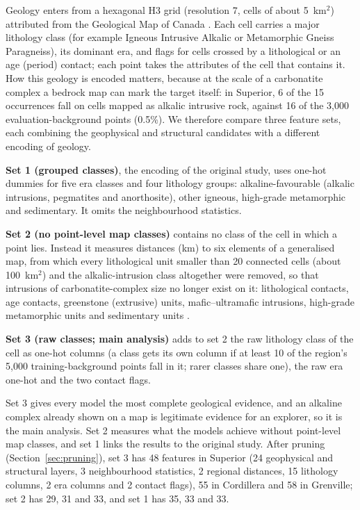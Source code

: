 \documentclass[pdflatex,sn-apa]{sn-jnl}
\begin{document}
Geology enters from a hexagonal H3 grid (resolution 7, cells of about 5~km$^2$) attributed from the Geological Map of Canada \citep{Wheeler1996}. Each cell carries a major lithology class (for example Igneous Intrusive Alkalic or Metamorphic Gneiss Paragneiss), its dominant era, and flags for cells crossed by a lithological or an age (period) contact; each point takes the attributes of the cell that contains it. How this geology is encoded matters, because at the scale of a carbonatite complex a bedrock map can mark the target itself: in Superior, 6 of the 15 occurrences fall on cells mapped as alkalic intrusive rock, against 16 of the 3,000 evaluation-background points (0.5\%). We therefore compare three feature sets, each combining the geophysical and structural candidates with a different encoding of geology.

\textbf{Set 1 (grouped classes)}, the encoding of the original study, uses one-hot dummies for five era classes and four lithology groups: alkaline-favourable (alkalic intrusions, pegmatites and anorthosite), other igneous, high-grade metamorphic and sedimentary. It omits the neighbourhood statistics.

\textbf{Set 2 (no point-level map classes)} contains no class of the cell in which a point lies. Instead it measures distances (km) to six elements of a generalised map, from which every lithological unit smaller than 20 connected cells (about 100~km$^2$) and the alkalic-intrusion class altogether were removed, so that intrusions of carbonatite-complex size no longer exist on it: lithological contacts, age contacts, greenstone (extrusive) units, mafic--ultramafic intrusions, high-grade metamorphic units and sedimentary units \citep[cf.][]{Luo2026}.

\textbf{Set 3 (raw classes; main analysis)} adds to set 2 the raw lithology class of the cell as one-hot columns (a class gets its own column if at least 10 of the region's 5,000 training-background points fall in it; rarer classes share one), the raw era one-hot and the two contact flags.

Set 3 gives every model the most complete geological evidence, and an alkaline complex already shown on a map is legitimate evidence for an explorer, so it is the main analysis. Set 2 measures what the models achieve without point-level map classes, and set 1 links the results to the original study. After pruning (Section~\ref{sec:pruning}), set 3 has 48 features in Superior (24 geophysical and structural layers, 3 neighbourhood statistics, 2 regional distances, 15 lithology columns, 2 era columns and 2 contact flags), 55 in Cordillera and 58 in Grenville; set 2 has 29, 31 and 33, and set 1 has 35, 33 and 33.
\end{document}
